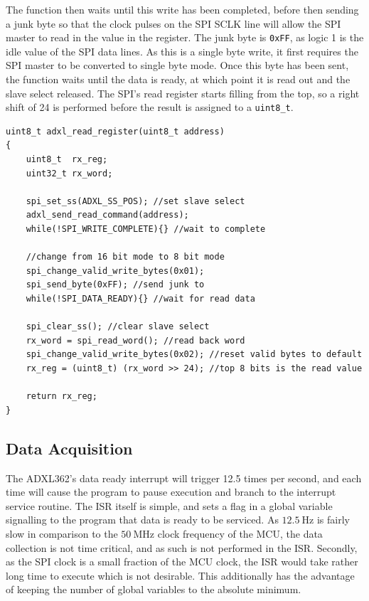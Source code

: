 \documentclass[11pt,british]{report}
\begin{document}
The function then waits until this write has been completed, before then sending a junk byte so that the clock pulses on the SPI SCLK line will allow the SPI master to read in the value in the register. The junk byte is \texttt{0xFF}, as logic 1 is the idle value of the SPI data lines. As this is a single byte write, it first requires the SPI master to be converted to single byte mode. Once this byte has been sent, the function waits until the data is ready, at which point it is read out and the slave select released. The SPI's read register starts filling from the top, so a right shift of 24 is performed before the result is assigned to a  \lstinline[style={c-style}]|uint8_t|.
\begin{lstlisting}[style={c-style}]
uint8_t adxl_read_register(uint8_t address)
{
    uint8_t  rx_reg;
	uint32_t rx_word;
	
	spi_set_ss(ADXL_SS_POS); //set slave select
	adxl_send_read_command(address);
	while(!SPI_WRITE_COMPLETE){} //wait to complete
	
	//change from 16 bit mode to 8 bit mode
	spi_change_valid_write_bytes(0x01);
	spi_send_byte(0xFF); //send junk to 
	while(!SPI_DATA_READY){} //wait for read data
	
	spi_clear_ss(); //clear slave select
	rx_word = spi_read_word(); //read back word
	spi_change_valid_write_bytes(0x02); //reset valid bytes to default
	rx_reg = (uint8_t) (rx_word >> 24); //top 8 bits is the read value
	
	return rx_reg;
}
\end{lstlisting}

\subsection*{Data Acquisition}
The ADXL362's data ready interrupt will trigger 12.5 times per second, and each time will cause the program to pause execution and branch to the interrupt service routine.
The ISR itself is simple, and sets a flag in a global variable signalling to the program that data is ready to be serviced. As $12.5~\si{\hertz}$ is fairly slow in comparison to the $50~\si{\mega\hertz}$ clock frequency of the MCU, the data collection is not time critical, and as such is not performed in the ISR. Secondly, as the SPI clock is a small fraction of the MCU clock, the ISR would take rather long time to execute which is not desirable. This additionally has the advantage of keeping the number of global variables to the absolute minimum.
\end{document}

